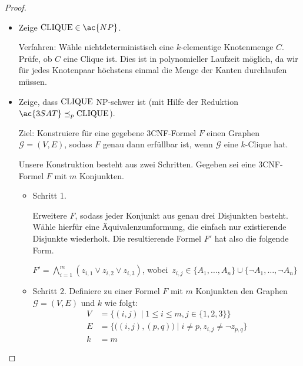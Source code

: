 \begin{proof}
    \
    \begin{itemize}
     \item Zeige $\CLIQUE\in \ac{NP}$.
     
     Verfahren: 
     Wähle nichtdeterministisch eine $k$-elementige Knotenmenge $C$.
     Prüfe, ob $C$ eine Clique ist.
     Dies ist in polynomieller Laufzeit möglich, da wir für jedes Knotenpaar höchstens einmal die Menge der Kanten durchlaufen müssen.
     
     \item Zeige, dass $\operatorname{CLIQUE}$ \ac{NP}-schwer ist (mit Hilfe der Reduktion  $\ac{3SAT} \preceq_p \CLIQUE$).
     
     Ziel: Konstruiere für eine gegebene 3CNF-Formel $F$ einen Graphen $\mathcal{G}=(V,E)$, sodass $F$ genau dann erfüllbar ist, wenn $\mathcal{G}$ eine $k$-Clique hat.
     
     Unsere Konstruktion besteht aus zwei Schritten.
     Gegeben sei eine 3CNF-Formel $F$ mit $m$ Konjunkten.
     
     \begin{itemize}
      \item Schritt 1.
      
      Erweitere $F$, sodass jeder Konjunkt aus genau drei Disjunkten besteht.
      Wähle hierfür eine Äquivalenzumformung, die einfach nur existierende Disjunkte wiederholt.
      Die resultierende Formel $F'$ hat also die folgende Form.
      
      $F' = \bigwedge\limits_{i=1}^m (z_{i,1}\lor z_{i,2}\lor z_{i,3})$, wobei\ $z_{i,j}\in \{A_1,\dots,A_n\}\cup\{\neg A_1,\dots,\neg A_n\}$
      \item Schritt 2.
       Definiere zu einer Formel $F$ mit $m$ Konjunkten den Graphen $\mathcal{G} = (V,E)$ und $k$ wie folgt:
	\begin{align*}
		V &= \{ (i,j) \mid 1\leq i\leq m, j\in\{1,2,3\} \}\\
		E &= \{\big((i,j),(p,q)\big) \mid i\neq p, z_{i,j}\neq\neg z_{p,q}\}\\
		k &= m
	\end{align*}
     \end{itemize}


\end{itemize}
\end{proof}
